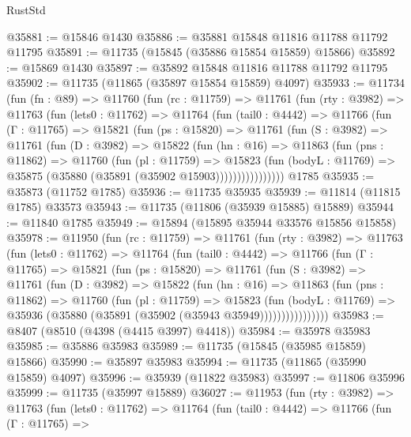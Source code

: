 \begin{lexlean}{RustStd}
\begin{coremodule}
@35881 := @15846 @1430
@35886 := @35881 @15848 @11816 @11788 @11792 @11795
@35891 := @11735 (@15845 (@35886 @15854 @15859) @15866)
@35892 := @15869 @1430
@35897 := @35892 @15848 @11816 @11788 @11792 @11795
@35902 := @11735 (@11865 (@35897 @15854 @15859) @4097)
@35933 := @11734
    (fun (fn : @89) =>
    @11760
      (fun (rc : @11759) =>
      @11761
        (fun (rty : @3982) =>
        @11763
          (fun (lets0 : @11762) =>
          @11764
            (fun (tail0 : @4442) =>
            @11766
              (fun (Γ : @11765) =>
              @15821
                (fun (ps : @15820) =>
                @11761
                  (fun (S : @3982) =>
                  @11761
                    (fun (D : @3982) =>
                    @15822
                      (fun (hn : @16) =>
                      @11863
                        (fun (pns : @11862) =>
                        @11760
                          (fun (pl : @11759) =>
                          @15823
                            (fun (bodyL : @11769) =>
                            @35875 (@35880 (@35891 (@35902 @15903))))))))))))))))
    @1785
@35935 := @35873 (@11752 @1785)
@35936 := @11735 @35935
@35939 := @11814 (@11815 @1785) @33573
@35943 := @11735 (@11806 (@35939 @15885) @15889)
@35944 := @11840 @1785
@35949 := @15894 (@15895 @35944 @33576 @15856 @15858)
@35978 := @11950
    (fun (rc : @11759) =>
    @11761
      (fun (rty : @3982) =>
      @11763
        (fun (lets0 : @11762) =>
        @11764
          (fun (tail0 : @4442) =>
          @11766
            (fun (Γ : @11765) =>
            @15821
              (fun (ps : @15820) =>
              @11761
                (fun (S : @3982) =>
                @11761
                  (fun (D : @3982) =>
                  @15822
                    (fun (hn : @16) =>
                    @11863
                      (fun (pns : @11862) =>
                      @11760
                        (fun (pl : @11759) =>
                        @15823
                          (fun (bodyL : @11769) =>
                          @35936 (@35880 (@35891 (@35902 (@35943 @35949))))))))))))))))
@35983 := @8407 (@8510 (@4398 (@4415 @3997) @4418))
@35984 := @35978 @35983
@35985 := @35886 @35983
@35989 := @11735 (@15845 (@35985 @15859) @15866)
@35990 := @35897 @35983
@35994 := @11735 (@11865 (@35990 @15859) @4097)
@35996 := @35939 (@11822 @35983)
@35997 := @11806 @35996
@35999 := @11735 (@35997 @15889)
@36027 := @11953
    (fun (rty : @3982) =>
    @11763
      (fun (lets0 : @11762) =>
      @11764
        (fun (tail0 : @4442) =>
        @11766
          (fun (Γ : @11765) =>

\end{coremodule}
\end{lexlean}
